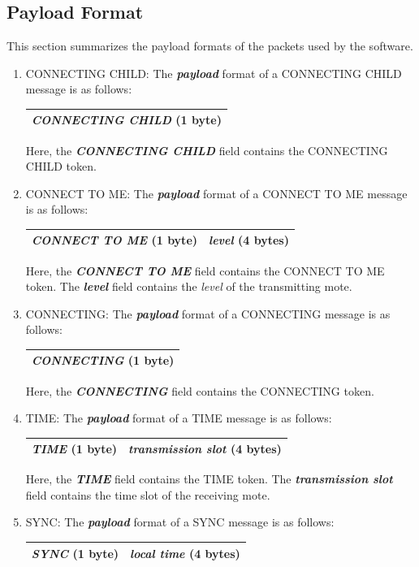 \subsection{Payload Format}
This section summarizes the payload formats of the packets used by the software.
\begin{enumerate}
\item CONNECTING CHILD: The \textit{\textbf{payload}} format of a CONNECTING CHILD message is as follows:\\
\begin{tabular}{|c|}
\hline 
\textit{\textbf{CONNECTING CHILD}} (1 byte) \\ 
\hline 
\end{tabular}

Here, the \textit{\textbf{CONNECTING CHILD}} field contains the CONNECTING CHILD token.
\item CONNECT TO ME: The \textit{\textbf{payload}} format of a CONNECT TO ME message is as follows:\\
\begin{tabular}{|c|c|}
\hline 
\textit{\textbf{CONNECT TO ME}} (1 byte) & \textit{\textbf{level}} (4 bytes) \\ 
\hline 
\end{tabular}

Here, the \textit{\textbf{CONNECT TO ME}} field contains the CONNECT TO ME token. The \textit{\textbf{level}} field contains the \textit{level} of the transmitting mote.

\item CONNECTING: The \textit{\textbf{payload}} format of a CONNECTING message is as follows:\\
\begin{tabular}{|c|}
\hline 
\textit{\textbf{CONNECTING}} (1 byte) \\ 
\hline 
\end{tabular}

Here, the \textit{\textbf{CONNECTING}} field contains the CONNECTING token.
\item TIME: The \textit{\textbf{payload}} format of a TIME message is as follows:\\
\begin{tabular}{|c|c|}
\hline 
\textit{\textbf{TIME}} (1 byte) & \textit{\textbf{transmission slot}} (4 bytes) \\ 
\hline 
\end{tabular} 

Here, the \textit{\textbf{TIME}} field contains the TIME token. The \textit{\textbf{transmission slot}} field contains the time slot of the receiving mote.
\item SYNC: The \textit{\textbf{payload}} format of a SYNC message is as follows:\\
\begin{tabular}{|c|c|}
\hline 
\textit{\textbf{SYNC}} (1 byte) & \textit{\textbf{local time}} (4 bytes) \\ 
\hline 
\end{tabular} 


\end{enumerate}
